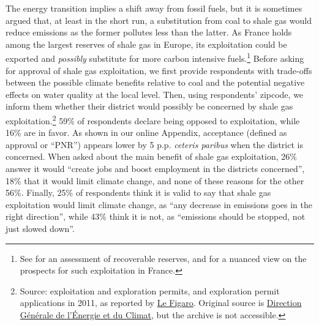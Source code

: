 \documentclass[english,5p,authoryear]{elsarticle}
\begin{document}
The energy transition implies a shift away from fossil fuels, but it is sometimes argued that, at least in the short run, a substitution from coal to shale gas would reduce emissions as the former pollutes less than the latter. As France holds among the largest reserves of shale gas in Europe, its exploitation could be exported and \textit{possibly} substitute for more carbon intensive fuels.\footnote{See \citet{eia_shale_2013} for an assessment of recoverable reserves, and \citet{saussey_2018} for a nuanced view on the prospects for such exploitation in France.} Before asking for approval of shale gas exploitation, we first provide respondents with trade-offs between the possible climate benefits relative to coal and the potential negative effects on water quality at the local level. Then, using respondents' zipcode, we inform them whether their district would possibly be concerned by shale gas exploitation.\footnote{Source: exploitation and exploration permits, and exploration permit applications in 2011, as reported by \href{http://www.lefigaro.fr/societes/2011/10/04/04015-20111004ARTFIG00465-gaz-de-schiste-total-veut-des-explications.php}{Le Figaro}. Original source is \href{http://www.minergies.fr/fr/cartographie}{Direction Générale de l'Énergie et du Climat}, but the archive is not accessible.} 59\% of respondents declare being opposed to exploitation, while 16\% are in favor. As shown in our online Appendix, acceptance (defined as approval or ``PNR'') appears lower by 5 p.p. \textit{ceteris paribus} when the district is concerned. When asked about the main benefit of shale gas exploitation, 26\% answer it would ``create jobs and boost employment in the districts concerned'', 18\% that it would limit climate change, and none of these reasons for the other 56\%. Finally, 25\% of respondents think it is valid to say that shale gas exploitation would limit climate change, as ``any decrease in emissions goes in the right direction'', while 43\% think it is not, as ``emissions should be stopped, not just slowed down''. %

\end{document}
